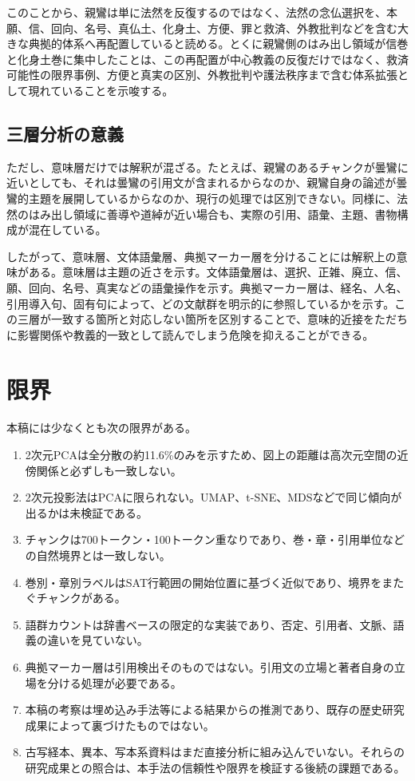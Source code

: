 \documentclass[uplatex,dvipdfmx,11pt,a4paper]{jsarticle}
\begin{document}
このことから、親鸞は単に法然を反復するのではなく、法然の念仏選択を、本願、信、回向、名号、真仏土、化身土、方便、罪と救済、外教批判などを含む大きな典拠的体系へ再配置していると読める。とくに親鸞側のはみ出し領域が信巻と化身土巻に集中したことは、この再配置が中心教義の反復だけではなく、救済可能性の限界事例、方便と真実の区別、外教批判や護法秩序まで含む体系拡張として現れていることを示唆する。

\subsection{三層分析の意義}

ただし、意味層だけでは解釈が混ざる。たとえば、親鸞のあるチャンクが曇鸞に近いとしても、それは曇鸞の引用文が含まれるからなのか、親鸞自身の論述が曇鸞的主題を展開しているからなのか、現行の処理では区別できない。同様に、法然のはみ出し領域に善導や道綽が近い場合も、実際の引用、語彙、主題、書物構成が混在している。

したがって、意味層、文体語彙層、典拠マーカー層を分けることには解釈上の意味がある。意味層は主題の近さを示す。文体語彙層は、選択、正雑、廃立、信、願、回向、名号、真実などの語彙操作を示す。典拠マーカー層は、経名、人名、引用導入句、固有句によって、どの文献群を明示的に参照しているかを示す。この三層が一致する箇所と対応しない箇所を区別することで、意味的近接をただちに影響関係や教義的一致として読んでしまう危険を抑えることができる。

\section{限界}

本稿には少なくとも次の限界がある。

\begin{enumerate}
  \item 2次元PCAは全分散の約11.6\%のみを示すため、図上の距離は高次元空間の近傍関係と必ずしも一致しない。
  \item 2次元投影法はPCAに限られない。UMAP、t-SNE、MDSなどで同じ傾向が出るかは未検証である。
  \item チャンクは700トークン・100トークン重なりであり、巻・章・引用単位などの自然境界とは一致しない。
  \item 巻別・章別ラベルはSAT行範囲の開始位置に基づく近似であり、境界をまたぐチャンクがある。
  \item 語群カウントは辞書ベースの限定的な実装であり、否定、引用者、文脈、語義の違いを見ていない。
  \item 典拠マーカー層は引用検出そのものではない。引用文の立場と著者自身の立場を分ける処理が必要である。
  \item 本稿の考察は埋め込み手法等による結果からの推測であり、既存の歴史研究成果によって裏づけたものではない。
  \item 古写経本、異本、写本系資料はまだ直接分析に組み込んでいない。それらの研究成果との照合は、本手法の信頼性や限界を検証する後続の課題である。
\end{enumerate}
\end{document}
